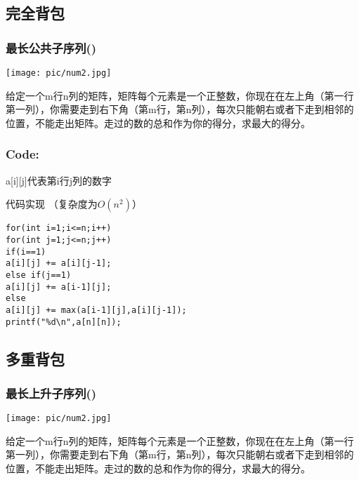 \documentclass{beamer}
\begin{document}
\subsection{完全背包}
\begin{frame}
\frametitle{最长公共子序列()}

\begin{minipage}[b]{0.30\linewidth}
\texttt{[image: pic/num2.jpg]}
\end{minipage}
\hfill
\begin{minipage}[b]{0.55\linewidth}

给定一个m行n列的矩阵，矩阵每个元素是一个正整数，你现在在左上角（第一行第一列），你需要走到右下角（第m行，第n列），每次只能朝右或者下走到相邻的位置，不能走出矩阵。走过的数的总和作为你的得分，求最大的得分。

\end{minipage}
\end{frame}

\begin{frame}[fragile]
\frametitle{Code:}
a[i][j]代表第i行j列的数字
\begin{block}{代码实现  （复杂度为$O(n^2)$）}
\begin{lstlisting}
for(int i=1;i<=n;i++)
for(int j=1;j<=n;j++)
if(i==1)    
a[i][j] += a[i][j-1];
else if(j==1)
a[i][j] += a[i-1][j];
else
a[i][j] += max(a[i-1][j],a[i][j-1]);
printf("%d\n",a[n][n]);
\end{lstlisting}
\end{block}
\end{frame}

\subsection{多重背包}
\begin{frame}
\frametitle{最长上升子序列()}

\begin{minipage}[b]{0.30\linewidth}
\texttt{[image: pic/num2.jpg]}
\end{minipage}
\hfill
\begin{minipage}[b]{0.55\linewidth}

给定一个m行n列的矩阵，矩阵每个元素是一个正整数，你现在在左上角（第一行第一列），你需要走到右下角（第m行，第n列），每次只能朝右或者下走到相邻的位置，不能走出矩阵。走过的数的总和作为你的得分，求最大的得分。

\end{minipage}
\end{frame}
\end{document}
